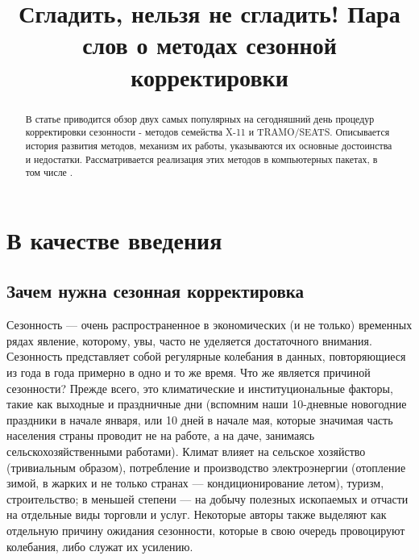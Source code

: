 \documentclass[final,pdftex]{../../template/epsilonj}\usepackage[]{graphicx}\usepackage[]{color}
\begin{document}
\setcounter{page}{44}

\begin{frontmatter}
\title{Сгладить, нельзя не сгладить! Пара слов о методах сезонной корректировки}

\begin{aug}
\author{ }%


\address{НИУ ВШЭ, Москва.}
\end{aug}

\begin{abstract}
В статье приводится обзор двух самых популярных на сегодняшний день процедур корректировки сезонности - методов семейства X-11 и TRAMO/SEATS. Описывается история развития методов, механизм их работы, указываются их основные достоинства и недостатки. Рассматривается реализация этих методов в компьютерных пакетах, в том числе . 
\end{abstract}

\begin{keyword}
\end{keyword}

\end{frontmatter}


\section{В качестве введения}
\subsection{Зачем нужна сезонная корректировка}

Сезонность --- очень распространенное в экономических (и не только) временных рядах явление, которому, увы, часто не уделяется достаточного внимания. Сезонность представляет собой регулярные колебания в данных, повторяющиеся из года в года примерно в одно и то же время. Что же является причиной сезонности? Прежде всего, это климатические и институциональные факторы, такие как выходные и праздничные дни (вспомним наши 10-дневные новогодние праздники в начале января, или 10 дней в начале мая, которые значимая часть населения страны проводит не на работе, а на даче, занимаясь сельскохозяйственными работами). Климат влияет на сельское хозяйство (тривиальным образом), потребление и производство электроэнергии (отопление зимой, в жарких и не только странах --- кондиционирование летом), туризм, строительство; в меньшей степени --- на добычу полезных ископаемых и отчасти на отдельные виды торговли и услуг. Некоторые авторы также выделяют как отдельную причину ожидания сезонности, которые в свою очередь провоцируют колебания, либо служат их усилению. 
\end{document}
